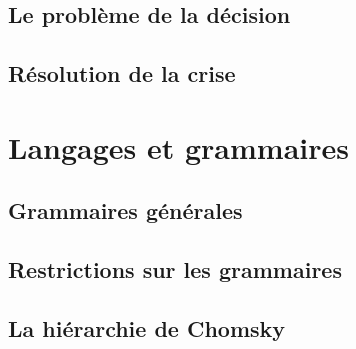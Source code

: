 \documentclass[9pt]{beamer}
\begin{document}
\subsection{Le problème de la décision}








 
\subsection{Résolution de la crise}





 
\section{Langages et grammaires}
 
\subsection{Grammaires générales}




 
\subsection{Restrictions sur les grammaires}




 
\subsection{La hiérarchie de Chomsky}




 
\end{document}

